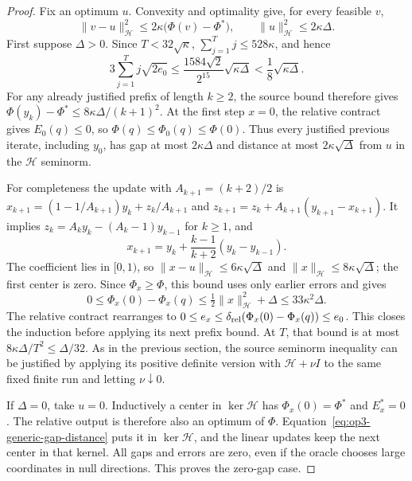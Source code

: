 \begin{proof}
Fix an optimum $u$. Convexity and optimality give, for every feasible $v$,
\begin{equation}
 \|v-u\|_{\mathcal H}^2\leq
 2\kappa\bigl(\Phi(v)-\Phi^*\bigr),\qquad
 \|u\|_{\mathcal H}^2\leq2\kappa\Delta.
 \label{eq:op3-generic-gap-distance}
\end{equation}
First suppose $\Delta>0$. Since $T<32\sqrt\kappa$,
$\sum_{j=1}^Tj\leq528\kappa$, and hence
\[
 3\sum_{j=1}^Tj\sqrt{2e_0}
 \leq\frac{1584\sqrt2}{2^{15}}\sqrt{\kappa\Delta}
 <\frac18\sqrt{\kappa\Delta}.
\]
For any already justified prefix of length $k\geq2$, the source bound
therefore gives $\Phi(y_k)-\Phi^*\leq8\kappa\Delta/(k+1)^2$.
At the first step $x=0$, the relative contract gives $E_0(q)\leq0$,
so $\Phi(q)\leq\Phi_0(q)\leq\Phi(0)$. Thus every justified previous
iterate, including $y_0$, has gap at most $2\kappa\Delta$ and distance
at most $2\kappa\sqrt\Delta$ from $u$ in the $\mathcal H$ seminorm.

For completeness the update with $A_{k+1}=(k+2)/2$ is
$x_{k+1}=(1-1/A_{k+1})y_k+z_k/A_{k+1}$ and
$z_{k+1}=z_k+A_{k+1}(y_{k+1}-x_{k+1})$.
It implies $z_k=A_ky_k-(A_k-1)y_{k-1}$ for $k\geq1$, and
\[
 x_{k+1}=y_k+\frac{k-1}{k+2}(y_k-y_{k-1}).
\]
The coefficient lies in $[0,1)$, so
$\|x-u\|_{\mathcal H}\leq6\kappa\sqrt\Delta$ and
$\|x\|_{\mathcal H}\leq8\kappa\sqrt\Delta$; the first center is zero.
Since $\Phi_x\geq\Phi$, this bound uses only earlier errors and gives
\begin{equation}
 0\leq\Phi_x(0)-\Phi_x(q)
 \leq\tfrac12\|x\|_{\mathcal H}^2+\Delta
 \leq33\kappa^2\Delta.
 \label{eq:op3-generic-model-range}
\end{equation}
The relative contract rearranges to
$0\leq e_x\leq\delta_{\rm rel}(\Phi_x(0)-\Phi_x(q))\leq e_0$.
This closes the induction before applying its next prefix bound.
At $T$, that bound is at most $8\kappa\Delta/T^2\leq\Delta/32$.
As in the previous section, the source seminorm inequality can be justified
by applying its positive definite version with $\mathcal H+\nu I$ to
the same fixed finite run and letting $\nu\downarrow0$.

If $\Delta=0$, take $u=0$. Inductively a center in $\ker\mathcal H$
has $\Phi_x(0)=\Phi^*$ and $E_x^*=0$. The relative output is therefore
also an optimum of $\Phi$. Equation~\eqref{eq:op3-generic-gap-distance}
puts it in $\ker\mathcal H$, and the linear updates keep the next center
in that kernel. All gaps and errors are zero, even if the oracle chooses
large coordinates in null directions. This proves the zero-gap case.
\end{proof}


